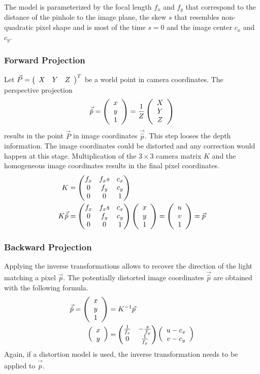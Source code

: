 The model is parameterized by the focal length $f_x$ and $f_y$ that correspond to the distance of the pinhole to the image plane, the skew $s$ that resembles non-quadratic pixel shape and is most of the time $s = 0$ and the image center $c_x$ and $c_y$.

\subsubsection*{Forward Projection}

Let $\vec{P} = \left(\begin{array}{ccc} X & Y & Z \end{array}\right)^T$ be a world point in camera coordinates.
The perspective projection
\begin{equation}
    \vec{\hat{p}} = \left(\begin{array}{c} x \\ y \\ 1 \end{array}\right) = \frac{1}{Z}\left(\begin{array}{c} X \\ Y \\ Z \end{array}\right)
    \label{eq:pinhole_forward}
\end{equation}
results in the point $\vec{P}$ in image coordinates $\vec{\hat{p}}$. This step looses the depth information.
The image coordinates could be distorted and any correction would happen at this stage.
Multiplication of the $3 \times 3$ camera matrix $K$ and the homogeneous image coordinates results in the final pixel coordinates.
\begin{equation}
\begin{aligned}
K &= \begin{pmatrix}
        f_x & f_x s & c_x \\
        0   & f_y   & c_y \\
        0   & 0     & 1
     \end{pmatrix} \\
K \vec{\hat{p}} &= \begin{pmatrix}
        f_x & f_x s & c_x \\
        0   & f_y   & c_y \\
        0   & 0     & 1
     \end{pmatrix}\left(\begin{array}{c} x \\ y \\ 1 \end{array}\right) = \left(\begin{array}{c} u \\ v \\ 1 \end{array}\right) = \vec{p}
\end{aligned}
\end{equation}

\subsubsection*{Backward Projection}

Applying the inverse transformations allows to recover the direction of the light matching a pixel $\vec{p}$.
The potentially distorted image coordinates $\vec{\hat{p}}$ are obtained with the following formula.
\begin{equation}
\begin{aligned}
    \vec{\hat{p}} = \left(\begin{array}{c} x \\ y \\ 1 \end{array}\right) &= K^{-1} \vec{p} \\
    \left(\begin{array}{c} x \\ y \end{array}\right) &= \begin{pmatrix}\frac{1}{f_x} & -\frac{s}{f_y} \\ 0 & \frac{1}{f_y}\end{pmatrix} \left(\begin{array}{c} u - c_x \\ v - c_y \end{array}\right)
\end{aligned}
\end{equation}
Again, if a distortion model is used, the inverse transformation needs to be applied to $\vec{\hat{p}}$.

